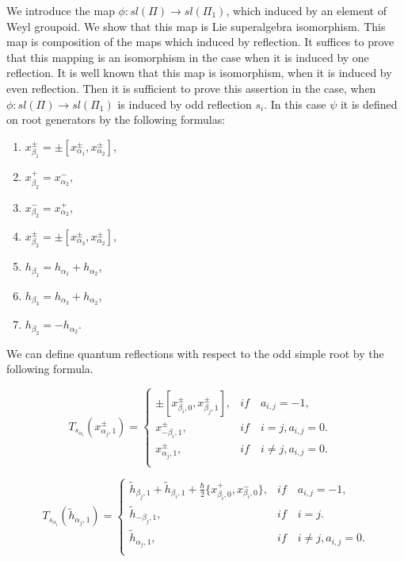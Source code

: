 \documentclass[english]{elsarticle}
\numberwithin{equation}{section}
\begin{document}
We introduce the map $\phi:sl(\Pi)\rightarrow sl(\Pi_1)$, which induced by an element of Weyl groupoid.  We show that this map is Lie superalgebra isomorphism. This map is composition of the maps which induced by reflection. It suffices to prove that this mapping is an isomorphism in the case when it is induced by one reflection. It is well known that this map is isomorphism, when it is induced by even reflection.  Then it is sufficient to prove this assertion in the case, when  $\phi:sl(\Pi)\rightarrow sl(\Pi_1)$ is induced by odd reflection $s_i$. In this case $\psi$ it is defined on root generators  by the following formulas:


\begin{enumerate}
    \item $x_{\beta_1}^{\pm}=\pm[x_{\alpha_1}^{\pm},x_{\alpha_2}^{\pm}]$,
    \item $x_{\beta_2}^+=x_{\alpha_2}^-$,
    \item $x_{\beta_2}^-=x_{\alpha_2}^+$,
    \item $x_{\beta_3}^{\pm}=\pm[x_{\alpha_3}^{\pm},x_{\alpha_2}^{\pm}]$,
    \item $h_{\beta_1}=h_{\alpha_1}+h_{\alpha_2}$,
    \item $h_{\beta_3}=h_{\alpha_3} + h_{\alpha_2}$,
    \item $h_{\beta_2}=-h_{\alpha_2}$.
\end{enumerate}


We can define quantum reflections with respect to the odd simple root by the following formula. 

\[
T_{s_{\alpha_i}}(x_{\alpha_j,1}^{\pm})=
\begin{cases}
        \pm[x_{\beta_i,0}^{\pm},x_{\beta_j,1}^{\pm}], & if \quad a_{i,j}=-1,\\
        x_{-\beta_i,1}^{\pm}, & if \quad i = j, a_{i,j}=0.\\
     x_{\alpha_j,1}^{\pm}, & if \quad i\neq j, a_{i,j}=0.\\
\end{cases} \quad
\]

\[ T_{s_{\alpha_i}}(\tilde{h}_{\alpha_j,1})=
\begin{cases}
        \tilde{h}_{\beta_j,1}+\tilde{h}_{\beta_i,1}+\frac{\hbar}{2}\{x_{\beta_i,0}^{+},x_{\beta_i,0}^{-}\}, & if \quad a_{i,j}=-1, \\
 \tilde{h}_{-\beta_j,1},& if \quad i=j.\\
    \tilde{h}_{\alpha_j,1},& if \quad i\neq j, a_{i,j}=0.\\
\end{cases}
\]
\end{document}
